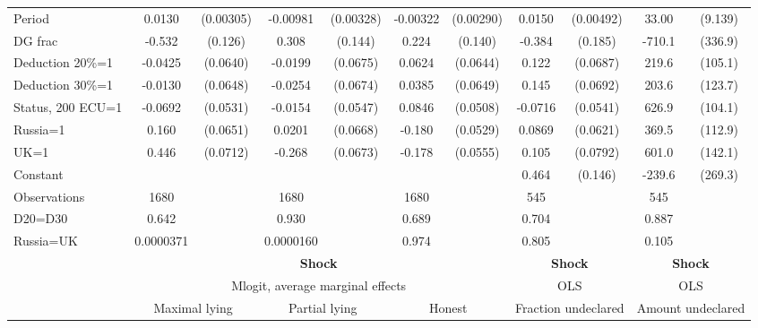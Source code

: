 \begin{tabular}{l|cccccc|cc|cc}
Period          &   0.0130\sym{***}&(0.00305)& -0.00981\sym{***}&(0.00328)& -0.00322         &(0.00290)&   0.0150\sym{***}&(0.00492)&    33.00\sym{***}&  (9.139)\\
DG frac         &   -0.532\sym{***}&  (0.126)&    0.308\sym{**} &  (0.144)&    0.224         &  (0.140)&   -0.384\sym{**} &  (0.185)&   -710.1\sym{**} &  (336.9)\\
Deduction 20\%=1&  -0.0425         & (0.0640)&  -0.0199         & (0.0675)&   0.0624         & (0.0644)&    0.122\sym{*}  & (0.0687)&    219.6\sym{**} &  (105.1)\\
Deduction 30\%=1&  -0.0130         & (0.0648)&  -0.0254         & (0.0674)&   0.0385         & (0.0649)&    0.145\sym{**} & (0.0692)&    203.6         &  (123.7)\\
Status, 200 ECU=1&  -0.0692         & (0.0531)&  -0.0154         & (0.0547)&   0.0846\sym{*}  & (0.0508)&  -0.0716         & (0.0541)&    626.9\sym{***}&  (104.1)\\
Russia=1        &    0.160\sym{**} & (0.0651)&   0.0201         & (0.0668)&   -0.180\sym{***}& (0.0529)&   0.0869         & (0.0621)&    369.5\sym{***}&  (112.9)\\
UK=1            &    0.446\sym{***}& (0.0712)&   -0.268\sym{***}& (0.0673)&   -0.178\sym{***}& (0.0555)&    0.105         & (0.0792)&    601.0\sym{***}&  (142.1)\\
Constant        &                  &         &                  &         &                  &         &    0.464\sym{***}&  (0.146)&   -239.6         &  (269.3)\\
\hline
Observations    &     1680         &         &     1680         &         &     1680         &         &      545         &         &      545         &         \\
D20=D30         &    0.642         &         &    0.930         &         &    0.689         &         &    0.704         &         &    0.887         &         \\
Russia=UK       &0.0000371         &         &0.0000160         &         &    0.974         &         &    0.805         &         &    0.105         &         \\
\hline\hline
&\multicolumn{6}{c|}{\bf Shock}&\multicolumn{2}{c|}{\bf Shock}&\multicolumn{2}{c}{\bf Shock}\\ &\multicolumn{6}{c|}{Mlogit, average marginal effects }&\multicolumn{2}{c|}{OLS}&\multicolumn{2}{c}{OLS}\\
                &\multicolumn{2}{c}{Maximal lying}&\multicolumn{2}{c}{Partial lying}&\multicolumn{2}{c}{Honest}  &\multicolumn{2}{c}{Fraction undeclared}&\multicolumn{2}{c}{Amount undeclared}\\

\end{tabular}
